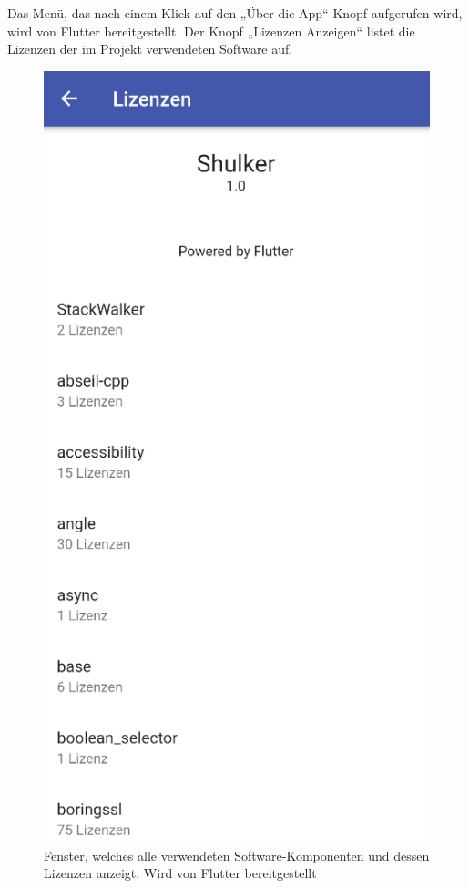 Das Menü, das nach einem Klick auf den „Über die App“-Knopf aufgerufen wird, wird von Flutter bereitgestellt.
Der Knopf „Lizenzen Anzeigen“ listet die Lizenzen der im Projekt verwendeten Software auf. 

\begin{figure}[H]
    \begin{center}
        \includegraphics[width=.4\textwidth]{images/mobile/Licences.png}
        \caption{Fenster, welches alle verwendeten Software-Komponenten und dessen Lizenzen anzeigt. 
        Wird von Flutter bereitgestellt }
    \end{center}
\end{figure}